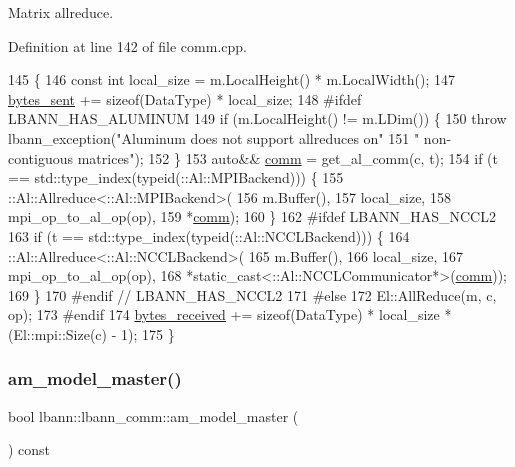 Matrix allreduce. 

Definition at line 142 of file comm.\+cpp.


\begin{DoxyCode}
145                                             \{
146   \textcolor{keyword}{const} \textcolor{keywordtype}{int} local\_size = m.LocalHeight() * m.LocalWidth();
147   \hyperlink{classlbann_1_1lbann__comm_ad1f146ae7337ece6266fd307944928e0}{bytes\_sent} += \textcolor{keyword}{sizeof}(DataType) * local\_size;
148 \textcolor{preprocessor}{#ifdef LBANN\_HAS\_ALUMINUM}
149   \textcolor{keywordflow}{if} (m.LocalHeight() != m.LDim()) \{
150     \textcolor{keywordflow}{throw} lbann\_exception(\textcolor{stringliteral}{"Aluminum does not support allreduces on"}
151                           \textcolor{stringliteral}{" non-contiguous matrices"});
152   \}
153   \textcolor{keyword}{auto}&& \hyperlink{file__io_8cpp_ab048c6f9fcbcfaa57ce68b00263dbebe}{comm} = get\_al\_comm(c, t);
154   \textcolor{keywordflow}{if} (t == std::type\_index(\textcolor{keyword}{typeid}(::Al::MPIBackend))) \{
155     ::Al::Allreduce<::Al::MPIBackend>(
156       m.Buffer(),
157       local\_size,
158       mpi\_op\_to\_al\_op(op),
159       *\hyperlink{file__io_8cpp_ab048c6f9fcbcfaa57ce68b00263dbebe}{comm});
160   \}
162 \textcolor{preprocessor}{#ifdef LBANN\_HAS\_NCCL2}
163   \textcolor{keywordflow}{if} (t == std::type\_index(\textcolor{keyword}{typeid}(::Al::NCCLBackend))) \{
164     ::Al::Allreduce<::Al::NCCLBackend>(
165       m.Buffer(),
166       local\_size,
167       mpi\_op\_to\_al\_op(op),
168       *\textcolor{keyword}{static\_cast<}::Al::NCCLCommunicator*\textcolor{keyword}{>}(\hyperlink{file__io_8cpp_ab048c6f9fcbcfaa57ce68b00263dbebe}{comm}));
169   \}
170 \textcolor{preprocessor}{#endif // LBANN\_HAS\_NCCL2}
171 \textcolor{preprocessor}{#else}
172   El::AllReduce(m, c, op);
173 \textcolor{preprocessor}{#endif}
174   \hyperlink{classlbann_1_1lbann__comm_afb99f57f7eafc0695bf28e6c26a8120f}{bytes\_received} += \textcolor{keyword}{sizeof}(DataType) * local\_size * (El::mpi::Size(c) - 1);
175 \}
\end{DoxyCode}
\mbox{\label{classlbann_1_1lbann__comm_ad8a5790dfa9191d4b4f889e8707e57f1}} 
\subsubsection{\texorpdfstring{am\+\_\+model\+\_\+master()}{am\_model\_master()}}
{\footnotesize\ttfamily bool lbann\+::lbann\+\_\+comm\+::am\+\_\+model\+\_\+master (\begin{DoxyParamCaption}{ }\end{DoxyParamCaption}) const\hspace{0.3cm}{\ttfamily [inline]}}

